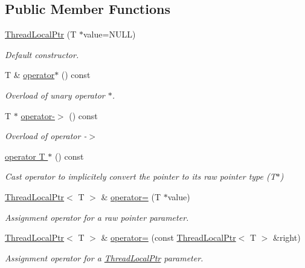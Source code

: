 \subsection*{Public Member Functions}
\begin{DoxyCompactItemize}
\item 
\hyperlink{classsf_1_1ThreadLocalPtr_a8c678211d7828d2a8c41cb534422d649}{Thread\-Local\-Ptr} (T $\ast$value=N\-U\-L\-L)
\begin{DoxyCompactList}\small\item\em Default constructor. \end{DoxyCompactList}\item 
T \& \hyperlink{classsf_1_1ThreadLocalPtr_aa3bac9a08e8739613961659d10e0fadd}{operator$\ast$} () const 
\begin{DoxyCompactList}\small\item\em Overload of unary operator $\ast$. \end{DoxyCompactList}\item 
T $\ast$ \hyperlink{classsf_1_1ThreadLocalPtr_aa0b559f78929b22cb2585cb2966edfb2}{operator-\/$>$} () const 
\begin{DoxyCompactList}\small\item\em Overload of operator -\/$>$ \end{DoxyCompactList}\item 
\hyperlink{classsf_1_1ThreadLocalPtr_ab4a6a341c26b58f0ed3ef86502bd9572}{operator T $\ast$} () const 
\begin{DoxyCompactList}\small\item\em Cast operator to implicitely convert the pointer to its raw pointer type (T$\ast$) \end{DoxyCompactList}\item 
\hyperlink{classsf_1_1ThreadLocalPtr}{Thread\-Local\-Ptr}$<$ T $>$ \& \hyperlink{classsf_1_1ThreadLocalPtr_a14dcf1cdf5f6b3bcdd633014b2b671f5}{operator=} (T $\ast$value)
\begin{DoxyCompactList}\small\item\em Assignment operator for a raw pointer parameter. \end{DoxyCompactList}\item 
\hyperlink{classsf_1_1ThreadLocalPtr}{Thread\-Local\-Ptr}$<$ T $>$ \& \hyperlink{classsf_1_1ThreadLocalPtr_a6792a6a808af06f0d13e3ceecf2fc947}{operator=} (const \hyperlink{classsf_1_1ThreadLocalPtr}{Thread\-Local\-Ptr}$<$ T $>$ \&right)
\begin{DoxyCompactList}\small\item\em Assignment operator for a \hyperlink{classsf_1_1ThreadLocalPtr}{Thread\-Local\-Ptr} parameter. \end{DoxyCompactList}\end{DoxyCompactItemize}


